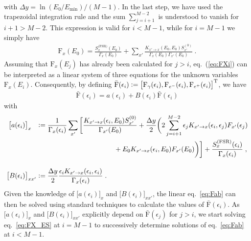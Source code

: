 \documentclass[11pt,a4paper]{article}
\newcommand{\Fpdi}{\mathrm{F}}
\newcommand{\eqsp}{\;}
\newcommand{\X}{x}
\newcommand{\ldefine}{\vcentcolon=}
\begin{document}
with $\Delta y = \ln(E_0/E_\text{min})/(M-1)$. In the last step, we have used the trapezoidal integration rule and the sum $\sum_{j=i+1}^{M-2}$ is understood to vanish for $i +1 > M - 2$. This expression is valid for $i < M -1$, while for $i=M-1$ we simply have
\begin{align}
\Fpdi_\X(E_0) = \frac{S_\X^{\text{(FSR)}}(E_0)}{\Gamma_\X(E_0)} + \sum_{\X'} \frac{K_{\X' \to \X} (E_0, E_0) S_{\X'}^{(0)}}{\Gamma_\X(E_0) \Gamma_{\X'} (E_0)}\eqsp.
\label{eq:FX_ES}
\end{align}
Assuming that $\Fpdi_\X(E_j)$ has already been calculated for $j>i$, eq.~(\ref{eq:FXi}) can be interpreted as a linear system of three equations for the unknown variables $\Fpdi_\X(E_i)$. Consequently, by defining $\bar{\Fpdi}(\epsilon_i) \ldefine \big[ \Fpdi_\gamma(\epsilon_i), \Fpdi_{e^-}(\epsilon_i), \Fpdi_{e^+}(\epsilon_i)\big]^\text{T}$, we have
\begin{align}
\bar{\Fpdi}(\epsilon_i) = a(\epsilon_i) + B(\epsilon_i) \bar{\Fpdi}(\epsilon_i)
\label{eq:Fab}
\end{align}
with
\begin{align}
\big[ a(\epsilon_i) \big]_{\X\hphantom{\X'}} & \ldefine \frac{1}{\Gamma_\X(\epsilon_i)} \sum_{\X'} \bigg[ \frac{K_{\X' \to \X} (\epsilon_i, E_0) S_{\X'}^{(0)}}{\Gamma_{\X'} (E_0)} + \frac{\Delta y}{2} \bigg( 2 \sum_{j=i+1}^{M-2} \epsilon_j K_{\X' \to \X} (\epsilon_i, \epsilon_j) F_{\X'}(\epsilon_j)\nonumber\\
& \hspace{4cm} + E_0 K_{\X' \to \X} (\epsilon_i, E_0) F_{\X'}(E_0) \bigg) \bigg] + \frac{S_\X^{\text{(FSR)}}(\epsilon_i)}{\Gamma_\X(\epsilon_i)}\eqsp, \\[4mm]
\big[B(\epsilon_i)\big]_{\X \X'} & \ldefine \frac{\Delta y}{2} \frac{\epsilon_i K_{\X' \to \X} (\epsilon_i, \epsilon_i)}{\Gamma_\X(\epsilon_i)}\eqsp.
\end{align}
Given the knowledge of $\big[ a(\epsilon_i) \big]_{\X}$ and $\big[B(\epsilon_i)\big]_{\X \X'}$, the linear eq.~\eqref{eq:Fab} can then be solved using standard techniques to calculate the values of $\bar{\Fpdi}(\epsilon_i)$.
As $\big[ a(\epsilon_i) \big]_{\X}$ and $\big[B(\epsilon_i)\big]_{\X \X'}$ explicitly depend on $\bar{\Fpdi}(\epsilon_j)$ for $j > i$, we start solving eq.~\eqref{eq:FX_ES} at $i=M-1$ to successively determine solutions of eq.~\eqref{eq:Fab} at $i < M-1$.
\end{document}
